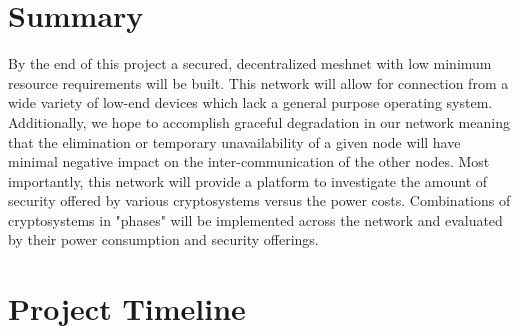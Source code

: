 \documentclass[tikz,a4paper,titlepage]{article}
\begin{document}
\section{Summary}

By the end of this project a secured, decentralized meshnet with low minimum resource requirements will be built. This network will allow for connection from a wide variety of low-end devices which lack a general purpose operating system. Additionally, we hope to accomplish graceful degradation in our network meaning that the elimination or temporary unavailability of a given node will have minimal negative impact on the inter-communication of the other nodes. Most importantly, this network will provide a platform to investigate the amount of security offered by various cryptosystems versus the power costs. Combinations of cryptosystems in "phases" will be implemented across the network and evaluated by their power consumption and security offerings.

\section{Project Timeline}
\end{document}
